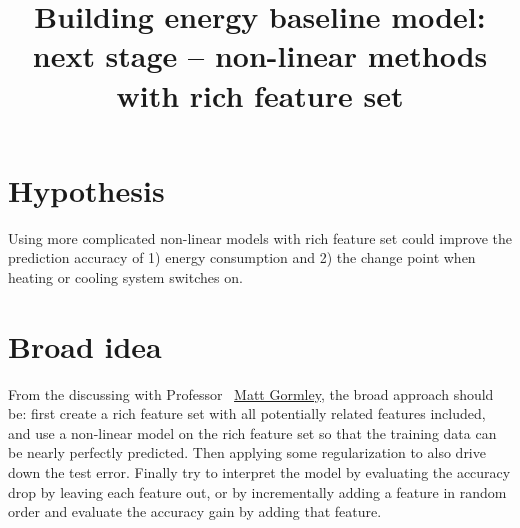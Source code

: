 \documentclass[12pt]{article}
\begin{document}
\title{Building energy baseline model: next stage -- non-linear methods with rich feature set}
\maketitle
\tableofcontents
\newpage
\section{Hypothesis}
Using more complicated non-linear models with rich feature set
  could improve the prediction accuracy of 1) energy consumption and
  2) the change point when heating or cooling system switches on.
\section{Broad idea}
From the discussing with Professor
~\href{http://www.cs.cmu.edu/~mgormley/}{Matt Gormley}, the broad
approach should be: first create a rich feature set with all
potentially related features included, and use a non-linear model on
the rich feature set so that the training data can be nearly perfectly
predicted. Then applying some regularization to also drive down the
test error. Finally try to interpret the model by evaluating the
accuracy drop by leaving each feature out, or by incrementally adding
a feature in random order and evaluate the accuracy gain by adding
that feature.
\end{document}
